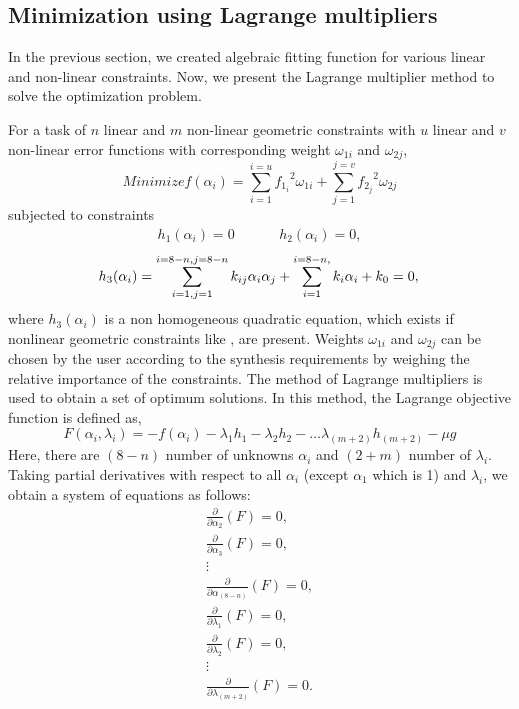\subsection{Minimization using Lagrange multipliers}\label{lagrangeMultiplier}
In the previous section, we created algebraic fitting function for various linear and non-linear constraints. Now, we present the Lagrange multiplier method to solve the optimization problem.

For a task of $n$ linear and $m$ non-linear geometric constraints with $u$ linear and $v$ non-linear error functions with corresponding weight $\omega_{1i}$ and $\omega_{2j}$,
\begin{equation}
Minimize f(\alpha_i) =  \sum_{i=1}^{i=u}{f_{1_i}}^2 \omega_{1i}+  \sum_{j=1}^{j=v}{f_{2_j}}^2\omega_{2j}
\end{equation}
subjected to constraints
\begin{equation*}
\begin{array}{cc}
h_1( {\alpha_i}) = 0 & \hspace{1cm} h_2( {\alpha_i}) =  0,
\end{array}
\end{equation*}
\begin{equation}\label{nonlinEq}
h_3( {\alpha_i}) =  \sum_{i=1,j=1}^{i=8-n, j=8-n}k_{ij}\alpha_i\alpha_j +  \sum_{i=1}^{i=8-n,}k_{i}\alpha_i + k_0 = 0,\\
\end{equation}
where $h_3(\alpha_i)$ is a non homogeneous quadratic equation, which exists if nonlinear geometric constraints like ,   are present. Weights $\omega_{1i}$ and $\omega_{2j}$ can be chosen by the user according to the synthesis requirements by weighing the relative importance of the constraints.
The method of Lagrange multipliers is used to obtain a set of optimum solutions. In this method, the Lagrange objective function is defined as,
\begin{equation}\label{newObFun}
F(\alpha_i,\lambda_i) =  -f(\alpha_i) - \lambda_1 h_1- \lambda_2 h_2-\hdots \lambda_{(m+2)} h_{(m+2)}-\mu g
\end{equation}
Here, there are $(8-n)$ number of unknowns $\alpha_i$ and $(2 + m)$ number of $\lambda_i$. Taking partial derivatives with respect to all $\alpha_i$ (except $\alpha_{1}$ which is 1) and $\lambda_i$, we obtain a system of equations as follows:
\begin{equation}\label{diffEqs}
\begin{array}{c}
\frac{\partial}{\partial \alpha_2}(F) = 0,\\
[0.25cm]
\frac{\partial}{\partial \alpha_3}(F) = 0,\\
\vdots \\
\frac{\partial}{\partial \alpha_{(8-n)}}(F) = 0,\\
[0.25cm]
\frac{\partial}{\partial \lambda_1}(F) = 0,\\
[0.25cm]
\frac{\partial}{\partial \lambda_2}(F) = 0,\\
\vdots \\
\frac{\partial}{\partial \lambda_{(m+2)}}(F) = 0.
\end{array}
\end{equation}

